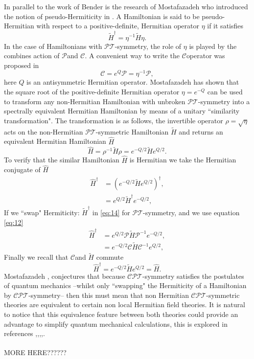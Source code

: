 \documentclass[12pt, a4paper]{report}
\newcommand\PT{\(\mathcal{PT}\)}
\newcommand\PP{\(\mathcal{P}\)}
\newcommand\CPT{\(\mathcal{CPT}\)}
\newcommand\CC{\(\mathcal{C}\)}
\begin{document}
In parallel to the work of Bender is the research of Mostafazadeh who introduced the notion of pseudo-Hermiticity in \cite{Mostafazadeh}. A Hamiltonian is said to be pseudo-Hermitian with respect to a positive-definite, Hermitian operator $\eta$ if it satisfies
\begin{equation}\label{eq:11}
\tilde{H}^{\dagger}  = \eta^{-1}\tilde{H}\eta.
\end{equation}
In the case of Hamiltonians with \PT-symmetry, the role of $\eta$ is played by the combines action of \PP\:and \CC. A convenient way to write the \CC\:operator was proposed in \cite{Bender_2006} 
\begin{equation}\label{eq:12}
\mathcal{C} = e^{Q}\mathcal{P} = \eta^{-1}\mathcal{P} ,
\end{equation}
here $Q$ is an antisymmetric Hermitian operator. Mostafazadeh \cite{Mostafazadeh2} has shown that the square root of the positive-definite Hermitian operator $\eta = e^{-Q}$ can be used to transform any non-Hermitian Hamiltonian with unbroken \PT-symmetry into a spectrally equivalent Hermitian Hamiltonian by means of a unitary ``similarity transformation"\cite{PTvsDH}\cite{Jones_2005}. The transformation is as follows, the invertible operator $\rho = \sqrt{\eta}$ acts on the non-Hermitian \PT-symmetric Hamiltonian $\tilde{H}$ and returns an equivalent Hermitian Hamiltonian $\hat{H}$
\begin{equation}\label{eq:13}
\hat{H} = \rho^{-1}\tilde{H}\rho = e^{-Q/2}\tilde{H}e^{Q/2}.
\end{equation}
To verify that the similar Hamiltonian $\hat{H}$ is Hermitian we take the Hermitian conjugate of $\hat{H}$
\begin{align}\label{eq:14}
\hat{H}^{\dagger} &= (e^{-Q/2}\tilde{H}e^{Q/2})^{\dagger}\nonumber,\\
& = e^{Q/2}\tilde{H}^{\dagger}e^{-Q/2},
\end{align}
If we ``swap" Hermiticity: $\tilde{H}^{\dagger}$ in \ref{eq:14} for \PT-symmetry, and we use equation \ref{eq:12}
\begin{align}\label{eq:15}
\hat{H}^{\dagger} &= e^{Q/2}\mathcal{P}\tilde{H}\mathcal{P}^{-1}e^{-Q/2}\nonumber,\\
&= e^{-Q/2}\mathcal{C}\tilde{H}\mathcal{C}^{-1}e^{Q/2},
\end{align}
Finally we recall that \CC\:and $\tilde{H}$ commute
\begin{equation}\label{eq:16}
\hat{H}^{\dagger} = e^{-Q/2}\tilde{H}e^{Q/2} = \hat{H}.
\end{equation}
Mostafazadeh \cite{Mostafazadeh}, conjectures that because \CPT-symmetry satisfies the postulates of quantum mechanics --whilst only ``swapping" the Hermiticity of a Hamiltonian by \CPT-symmetry-- then this must mean that non Hermitian \CPT-symmetric theories are equivalent to certain non local Hermitian field theories. It is natural to notice that this equivalence feature between both theories could provide an advantage to simplify quantum mechanical calculations, this is explored in references \cite{Mostafazadeh},\cite{EquivalentHH},\cite{Pseudo-HermiticityIII},\cite{Jones_2005},\cite{taleof2potentials}.\\\\
MORE HERE??????
\end{document}
